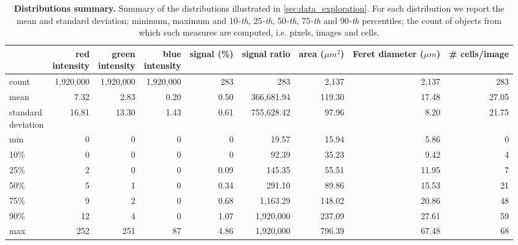 \begin{table}[]
{    \begin{tabular}{lrrrrrrrr}
    \toprule
    {} &          \thead{red\\intensity} &        \thead{green\\intensity} &         \thead{blue\\intensity} &  signal (\%) &  signal ratio &     area ($\mu m^2$) &  \thead{Feret\\diameter ($\mu m$)
    } &  \# cells/image \\
    \midrule
    count & 1,920,000 & 1,920,000 & 1,920,000 &      283 &        283 & 2,137 &        2,137 & 283\\ %
    mean  &         7.32 &         2.83 &         0.20 &        0.50 &    366,681.94 & 119.30 &           17.48 &    27.05 \\
    \thead{standard\\deviation}   &        16.81 &        13.30 &         1.43 &        0.61 &    755,628.42 &   97.96 &           8.20 &    21.75 \\
    min   &         0 &         0 &         0 &        0 &         19.57 &   15.94 &           5.86 &     0 \\
    10\%   &         0 &         0 &         0 &        0 &         92.39 &   35.23 &           9.42 &     4 \\
    25\%   &         2 &         0 &         0 &        0.09 &        145.35 &   55.51 &           11.95 &     7 \\
    50\%   &         5 &         1 &         0 &        0.34 &        291.10 &   89.86 &           15.53 &    21 \\
    75\%   &         9 &         2 &         0 &        0.68 &      1,163.29 & 148.02 &           20.86 &    48 \\
    90\%   &        12 &         4 &         0 &        1.07 &  1,920,000 & 237.09 &           27.61 &    59 \\
    max   &       252 &       251 &        87 &        4.86 &  1,920,000 & 796.39 &          67.48 &    68 \\
    \bottomrule
    \end{tabular}
    }
    \caption{\textbf{Distributions summary.} 
    Summary of the distributions illustrated in \cref{sec:data_exploration}. For each distribution we report the mean and standard deviation; minimum, maximum and 10\textit{-th}, 25\textit{-th}, 50\textit{-th}, 75\textit{-th} and 90\textit{-th} percentiles; the count of objects from which such measures are computed, i.e. pixels, images and cells.
    }
    \label{tab:data_features}
\end{table}





